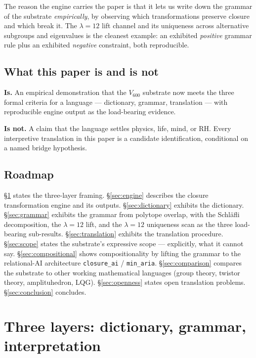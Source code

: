 \documentclass[11pt,a4paper]{article}
\begin{document}
The reason the engine carries the paper is that it lets us write
down the grammar of the substrate \emph{empirically}, by observing
which transformations preserve closure and which break it. The
$\lambda = 12$ lift channel and its uniqueness across alternative
subgroups and eigenvalues is the cleanest example: an exhibited
\emph{positive} grammar rule plus an exhibited \emph{negative}
constraint, both reproducible.

\subsection{What this paper is and is not}

\begin{scopebox}
\textbf{Is.} An empirical demonstration that the $V_{600}$
substrate now meets the three formal criteria for a language ---
dictionary, grammar, translation --- with reproducible engine
output as the load-bearing evidence.

\textbf{Is not.} A claim that the language settles physics, life,
mind, or RH. Every interpretive translation in this paper is a
candidate identification, conditional on a named bridge
hypothesis.
\end{scopebox}

\subsection{Roadmap}

\S\ref{sec:layers} states the three-layer framing.
\S\ref{sec:engine} describes the closure transformation engine and
its outputs.
\S\ref{sec:dictionary} exhibits the dictionary.
\S\ref{sec:grammar} exhibits the grammar from polytope overlap,
with the Schl\"afli decomposition, the $\lambda = 12$ lift, and the
$\lambda = 12$ uniqueness scan as the three load-bearing
sub-results.
\S\ref{sec:translation} exhibits the translation procedure.
\S\ref{sec:scope} states the substrate's expressive scope ---
explicitly, what it cannot say.
\S\ref{sec:compositional} shows compositionality by lifting the
grammar to the relational-AI architecture \texttt{closure\_ai} /
\texttt{min\_aria}.
\S\ref{sec:comparison} compares the substrate to other working
mathematical languages (group theory, twistor theory,
amplituhedron, LQG).
\S\ref{sec:openness} states open translation problems.
\S\ref{sec:conclusion} concludes.

\section{Three layers: dictionary, grammar, interpretation}
\label{sec:layers}
\end{document}
